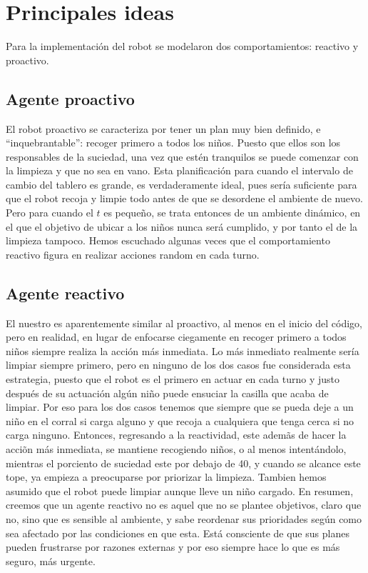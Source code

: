 \documentclass{llncs}
\begin{document}
\section{Principales ideas}

Para la implementaci\'on del robot se modelaron dos comportamientos: reactivo y proactivo. 

\subsection{Agente proactivo}
El robot proactivo se caracteriza por tener un plan muy bien definido, e ``inquebrantable'': recoger primero a todos los ni\~nos.
Puesto que ellos son los responsables de la suciedad, una vez que est\'en tranquilos se puede comenzar con la limpieza y que no sea en vano. Esta planificaci\'on para cuando el intervalo de cambio del tablero es grande, es verdaderamente ideal, pues ser\'ia 
suficiente para que el robot recoja y limpie todo antes de que se desordene el ambiente de nuevo. Pero para cuando el $t$ es peque\~no, se trata entonces de un ambiente din\'amico, en el que el objetivo de ubicar a los
ni\~nos nunca ser\'a cumplido, y por tanto el de la limpieza tampoco. 
Hemos escuchado algunas veces que el comportamiento reactivo figura en realizar acciones 
random en cada turno. 

\subsection{Agente reactivo}
El nuestro es aparentemente similar al proactivo, al menos en el inicio del c\'odigo, pero en 
realidad, en lugar de enfocarse ciegamente en recoger
primero a todos ni\~nos siempre realiza la acci\'on m\'as inmediata. Lo m\'as inmediato realmente 
ser\'ia limpiar siempre primero, pero en ninguno de los dos
casos fue considerada esta estrategia, puesto que el robot es el primero en actuar en cada turno y justo 
despu\'es de su actuaci\'on alg\'un ni\~no puede ensuciar la casilla que
acaba de limpiar. Por eso para los dos casos tenemos que siempre que se pueda deje a un 
ni\~no en el corral si carga alguno y que recoja a cualquiera
que tenga cerca si no carga ninguno. Entonces, regresando a la reactividad, este adem\~as de 
hacer la acci\~on m\'as inmediata, se mantiene recogiendo ni\~nos,
o al menos intent\'andolo, mientras el porciento de suciedad este por debajo de 40, y cuando se 
alcance este tope, ya empieza a preocuparse por priorizar la limpieza.
Tambien hemos asumido que el robot puede limpiar aunque lleve un ni\~no cargado. En 
resumen, creemos que un agente reactivo no es aquel que no se plantee
objetivos, claro que no, sino que es sensible al ambiente, y sabe reordenar sus prioridades 
seg\'un como sea afectado por las condiciones en que esta.
Est\'a consciente de que sus planes pueden frustrarse por razones externas y por eso siempre 
hace lo que es m\'as seguro, m\'as urgente.
\end{document}
